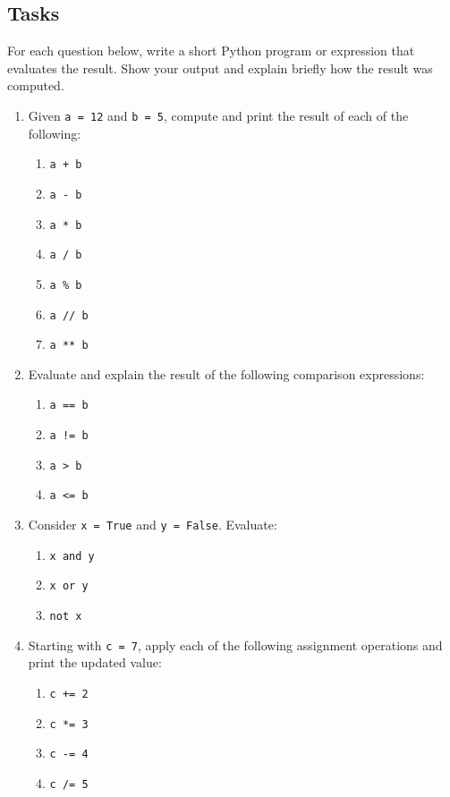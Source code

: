 \documentclass[11pt]{article}
\begin{document}
\subsection*{Tasks}
For each question below, write a short Python program or expression that evaluates the result. Show your output and explain briefly how the result was computed.
\begin{enumerate}[label=\arabic*.]
  \item Given \lstinline{a = 12} and \lstinline{b = 5}, compute and print the result of each of the following:
  \begin{enumerate}[label=(\alph*)]
    \item \lstinline{a + b}
    \item \lstinline{a - b}
    \item \lstinline{a * b}
    \item \lstinline{a / b}
    \item \lstinline{a % b}
    \item \lstinline{a // b}
    \item \lstinline{a ** b}
  \end{enumerate}

  \item Evaluate and explain the result of the following comparison expressions:
  \begin{enumerate}[label=(\alph*)]
    \item \lstinline{a == b}
    \item \lstinline{a != b}
    \item \lstinline{a > b}
    \item \lstinline{a <= b}
  \end{enumerate}

  \item Consider \lstinline{x = True} and \lstinline{y = False}. Evaluate:
  \begin{enumerate}[label=(\alph*)]
    \item \lstinline{x and y}
    \item \lstinline{x or y}
    \item \lstinline{not x}
  \end{enumerate}

  \item Starting with \lstinline{c = 7}, apply each of the following assignment operations and print the updated value:
  \begin{enumerate}[label=(\alph*)]
    \item \lstinline{c += 2}
    \item \lstinline{c *= 3}
    \item \lstinline{c -= 4}
    \item \lstinline{c /= 5}
  \end{enumerate}


\end{enumerate}
\end{document}
